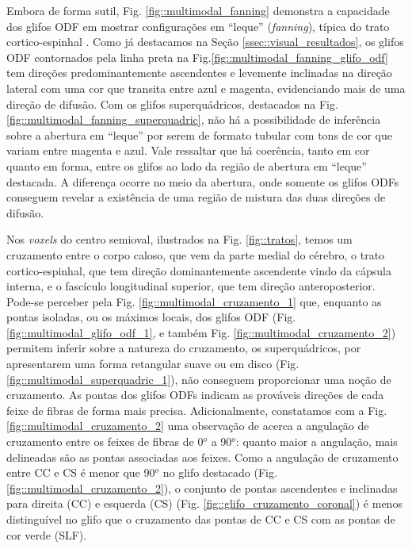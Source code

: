 Embora de forma sutil, Fig. \ref{fig::multimodal_fanning} demonstra a capacidade dos glifos ODF em mostrar configurações em ``leque'' (\textit{fanning}), típica do trato cortico-espinhal \cite{fortin2012, wang2019}. Como já destacamos na Seção \ref{ssec::visual_resultados}, os glifos ODF contornados pela linha preta na Fig.\ref{fig::multimodal_fanning_glifo_odf} tem  direções predominantemente ascendentes e levemente inclinadas na direção lateral com uma cor que transita entre azul e magenta, evidenciando mais de uma direção de difusão. Com os glifos superquádricos, destacados na Fig. \ref{fig::multimodal_fanning_superquadric}, não há a possibilidade de inferência sobre a abertura em ``leque'' por serem de formato tubular com tons de cor que variam entre magenta e azul. Vale ressaltar que há coerência, tanto em cor quanto em forma, entre os glifos ao lado da região de abertura em ``leque'' destacada. A diferença ocorre no meio da abertura, onde somente os glifos ODFs conseguem revelar a existência de uma região de mistura das duas direções de difusão.

Nos \textit{voxels} do centro semioval, ilustrados na Fig. \ref{fig::tratos},  temos um cruzamento entre o corpo caloso, que vem da parte medial do cérebro,
o trato cortico-espinhal, que tem direção dominantemente ascendente vindo da cápsula interna, e o fascículo longitudinal superior, que tem direção anteroposterior. Pode-se perceber pela Fig. \ref{fig::multimodal_cruzamento_1} que, 
enquanto as pontas isoladas, ou os máximos locais, dos glifos ODF (Fig. \ref{fig::multimodal_glifo_odf_1}, e também Fig. \ref{fig::multimodal_cruzamento_2}) permitem inferir sobre a natureza do cruzamento, os superquádricos, por apresentarem uma forma retangular suave ou em disco (Fig. \ref{fig::multimodal_superquadric_1}), não conseguem proporcionar uma noção de cruzamento. As pontas dos glifos ODFs indicam as prováveis direções de cada feixe de fibras de forma mais precisa. Adicionalmente, constatamos com a Fig. \ref{fig::multimodal_cruzamento_2} uma observação de  acerca a angulação de cruzamento entre os feixes de fibras de 0$^o$ a 90$^o$: quanto maior a angulação, mais delineadas são as pontas associadas aos feixes. Como a angulação de cruzamento entre CC e CS é menor que 90$^o$ no glifo destacado (Fig. \ref{fig::multimodal_cruzamento_2}), o conjunto de pontas ascendentes e inclinadas para direita (CC) e esquerda (CS) (Fig. \ref{fig::glifo_cruzamento_coronal}) é menos distinguível no glifo que o cruzamento das pontas de CC e CS com as pontas de cor verde (SLF).

